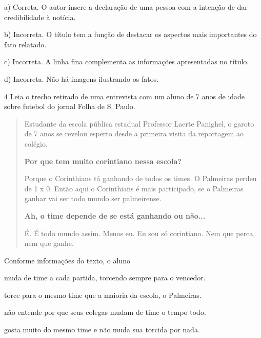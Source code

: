 
a) Correta. O autor insere a declaração de uma pessoa com a intenção de
dar credibilidade à notícia.

b) Incorreta. O título tem a função de destacar os aspectos mais
importantes do fato relatado.

c) Incorreta. A linha fina complementa as informações apresentadas no
título.

d) Incorreta. Não há imagens ilustrando os fatos.

\num{4} Leia o trecho retirado de uma entrevista com um aluno de 7 anos
de idade sobre futebol do jornal Folha de S. Paulo.

\begin{quote}
Estudante da escola pública estadual Professor Laerte Panighel, o garoto
de 7 anos se revelou esperto desde a primeira visita da reportagem ao
colégio.

\textbf{Por que tem muito corintiano nessa escola?}

Porque o Corinthians tá ganhando de todos os times. O Palmeiras perdeu
de 1 x 0. Então aqui o Corinthians é mais participado, se o
Palmeiras ganhar vai ser todo mundo ser palmeirense.

\textbf{Ah, o time depende de se está ganhando ou não...}

É. É todo mundo assim. Menos eu. Eu sou só corintiano. Nem que perca,
nem que ganhe.
\end{quote}


Conforme informações do texto, o aluno

\begin{escolha}
\item muda de time a cada partida, torcendo sempre para o vencedor.

\item torce para o mesmo time que a maioria da escola, o Palmeiras.

\item não entende por que seus colegas mudam de time o tempo todo.

\item gosta muito do mesmo time e não muda sua torcida por nada.
\end{escolha}


